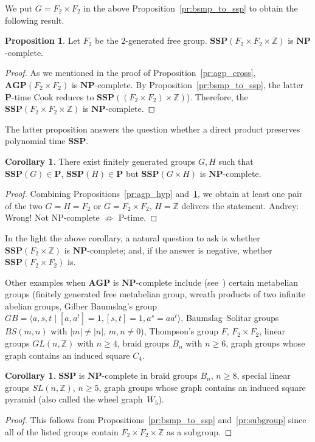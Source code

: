 \documentclass[10pt]{amsart}
\newcommand{\an}{\noindent\color{blue} Andrey: }{}
\theoremstyle{definition}
\newtheorem{proposition}[theorem]{Proposition}
\newtheorem{corollary}[theorem]{Corollary}
\def\P{{\mathbf{P}}}
\def\NP{{\mathbf{NP}}}
\def\SSP{{\mathbf{SSP}}}
\def\AGP{{\mathbf{AGP}}}
\begin{document}
We put $G=F_2\times F_2$ in the above Proposition~\ref{pr:bsmp_to_ssp} to obtain the following result.
\begin{proposition}\label{pr:ssp_cross}
Let $F_2$ be the $2$-generated free group. $\SSP(F_2\times F_2\times \mathbb Z)$ is $\NP$-complete.
\end{proposition}
\begin{proof}
As we mentioned in the proof of Proposition~\ref{pr:agp_cross}, $\AGP(F_2\times F_2)$ is $\NP$-complete. By Proposition~\ref{pr:bsmp_to_ssp}, the latter $\P$-time Cook reduces to $\SSP((F_2\times F_2)\times\mathbb Z)$). Therefore, the $\SSP(F_2\times F_2\times \mathbb Z)$ is $\NP$-complete.
\end{proof}

The latter proposition answers the question whether a direct product preserves polynomial time $\SSP$.

\begin{corollary}\label{cor:NP_complete_ssp_cross}
There exist finitely generated groups $G,H$ such that $\SSP(G)\in\P$, $\SSP(H)\in\P$ but $\SSP(G\times H)$ is $\NP$-complete.
\end{corollary}
\begin{proof}
Combining Propositions~\ref{pr:agp_hyp} and~\ref{pr:ssp_cross}, we obtain at least one pair of the two $G=H=F_2$ or $G=F_2\times F_2$, $H=\mathbb Z$ delivers the statement.{\an Wrong! Not NP-complete $\not\Rightarrow$ P-time.}
\end{proof}
In the light the above corollary, a natural question to ask is whether $\SSP(F_2\times \mathbb Z)$ is $\NP$-complete; and, if the answer is negative, whether $\SSP(F_2\times F_2)$ is.


Other examples when $\AGP$ is $\NP$-complete include (see~\cite{Miasnikov-Nikolaev-Ushakov:2014a}) certain metabelian groups (finitely generated free metabelian group, wreath products of two infinite abelian groups, Gilber Baumslag's group $GB=\langle a,s,t\mid [a,a^t]=1, [s,t]=1, a^s=aa^t\rangle$, Baumslag--Solitar groups $BS(m,n)$ with $|m|\neq |n|$, $m,n\neq 0$), Thompson's group $F$, $F_2\times F_2$, linear groups $GL(n, \mathbb Z)$ with $n\ge 4$, braid groups $B_n$ with $n\ge 6$, graph groups whose
graph contains an induced square $C_4$.



\begin{corollary}
$\SSP$ is $\NP$-complete in braid groups $B_n$, $n\ge 8$, special linear groups $SL(n,\mathbb Z)$, $n\ge 5$, graph groups whose graph contains an induced square pyramid (also called the wheel graph~$W_5$).
\end{corollary}
\begin{proof}
This follows from Propositions~\ref{pr:bsmp_to_ssp} and~\ref{pr:subgroup} since all of the listed groups contain $F_2\times F_2\times \mathbb Z$ as a subgroup.
\end{proof}
\end{document}
